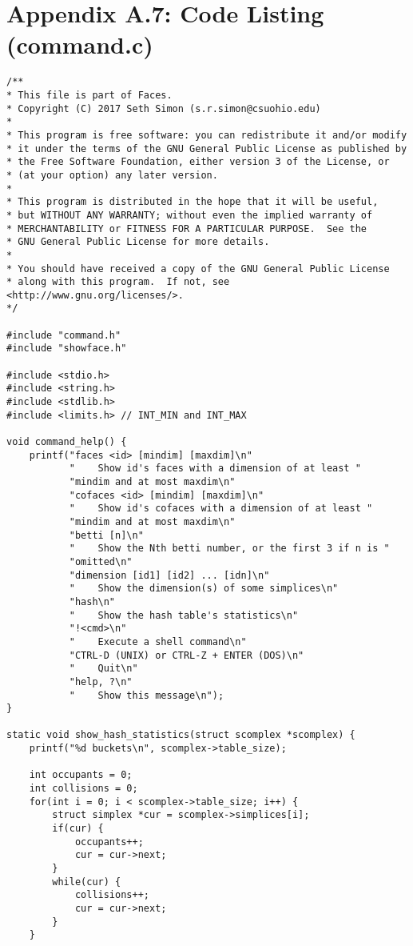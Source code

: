 \documentclass{article}
\begin{document}
\section{Appendix A.7: Code Listing (command.c)}
\small
\begin{verbatim}
/**
* This file is part of Faces.
* Copyright (C) 2017 Seth Simon (s.r.simon@csuohio.edu)
* 
* This program is free software: you can redistribute it and/or modify
* it under the terms of the GNU General Public License as published by
* the Free Software Foundation, either version 3 of the License, or
* (at your option) any later version.
* 
* This program is distributed in the hope that it will be useful,
* but WITHOUT ANY WARRANTY; without even the implied warranty of
* MERCHANTABILITY or FITNESS FOR A PARTICULAR PURPOSE.  See the
* GNU General Public License for more details.
* 
* You should have received a copy of the GNU General Public License
* along with this program.  If not, see <http://www.gnu.org/licenses/>.
*/

#include "command.h"
#include "showface.h"

#include <stdio.h>
#include <string.h>
#include <stdlib.h>
#include <limits.h> // INT_MIN and INT_MAX

void command_help() {
    printf("faces <id> [mindim] [maxdim]\n"
           "    Show id's faces with a dimension of at least "
           "mindim and at most maxdim\n"
           "cofaces <id> [mindim] [maxdim]\n"
           "    Show id's cofaces with a dimension of at least "
           "mindim and at most maxdim\n"
           "betti [n]\n"
           "    Show the Nth betti number, or the first 3 if n is "
           "omitted\n"
           "dimension [id1] [id2] ... [idn]\n"
           "    Show the dimension(s) of some simplices\n"
           "hash\n"
           "    Show the hash table's statistics\n"
           "!<cmd>\n"
           "    Execute a shell command\n"
           "CTRL-D (UNIX) or CTRL-Z + ENTER (DOS)\n"
           "    Quit\n"
           "help, ?\n"
           "    Show this message\n");
}

static void show_hash_statistics(struct scomplex *scomplex) {
    printf("%d buckets\n", scomplex->table_size);

    int occupants = 0;
    int collisions = 0;
    for(int i = 0; i < scomplex->table_size; i++) {
        struct simplex *cur = scomplex->simplices[i];
        if(cur) {
            occupants++;
            cur = cur->next;
        }
        while(cur) {
            collisions++;
            cur = cur->next;
        }
    }


\end{verbatim}
\end{document}
